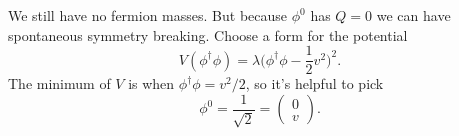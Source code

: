 \documentclass[a4paper,12pt]{article}
\begin{document}
We still have no fermion masses. But because $\phi^0$ has $Q=0$ we can have spontaneous symmetry breaking. Choose a form for the potential
\begin{equation}
V(\phi^\dagger \phi) = \lambda \bigg(\phi^\dagger \phi - \frac{1}{2}v^2\bigg)^2.
\end{equation}
The minimum of $V$ is when $\phi^\dagger \phi = v^2/2$, so it's helpful to pick 
\[\phi^0 = \frac{1}{\sqrt{2}} = \left( \begin{array}{cc}
0   \\
v   \end{array} \right). \]
\end{document}
